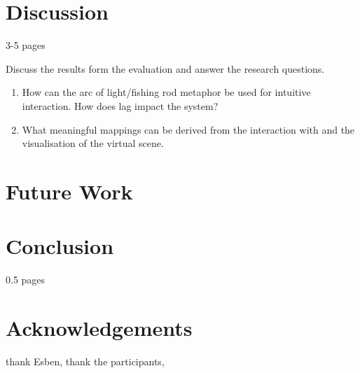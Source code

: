 \documentclass[10pt,a4paper]{scrartcl}
\begin{document}
\section{Discussion}
\label{sec:discussion}
3-5 pages

Discuss the results form the evaluation and answer the research questions. 

\begin{enumerate}
\item How can the arc of light/fishing rod metaphor be used for intuitive interaction. How does lag impact the system?
\item What meaningful mappings can be derived from the interaction with and the visualisation of the virtual scene.
\end{enumerate}

\section{Future Work}

\section{Conclusion}
0.5 pages

\section{Acknowledgements}
thank Esben, thank the participants,






\end{document}
